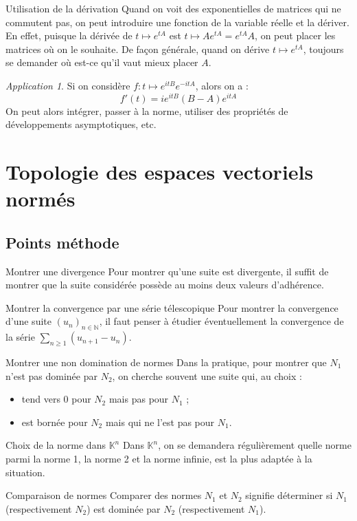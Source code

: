 \documentclass[french]{book}
\newcommand{\N}{\mathbb{N}}
\newcommand{\K}{\mathbb{K}}
\theoremstyle{plain}
\theoremstyle{definition}
\theoremstyle{remark}
\newtheorem*{app}{Application}
\begin{document}
\begin{AS}{Utilisation de la dérivation} Quand on voit des exponentielles de matrices qui ne commutent pas, on peut introduire une fonction de la variable réelle et la dériver. En effet, puisque la dérivée de $t\mapsto e^{tA}$ est $t\mapsto Ae^{tA}=e^{tA}A$, on peut placer les matrices où on le souhaite. De façon générale, quand on dérive $t\mapsto e^{tA}$, toujours se demander où est-ce qu'il vaut mieux placer $A$.
\end{AS}
\begin{app}
	Si on considère $f:t\mapsto e^{itB}e^{-itA}$, alors on a : $$f'(t)=ie^{itB}(B-A)e^{itA}$$ On peut alors intégrer, passer à la norme, utiliser des propriétés de développements asymptotiques, etc.
\end{app}


\chapter{Topologie des espaces vectoriels normés}
\localtableofcontents
\section{Points méthode}
\begin{PM}{Montrer une divergence} Pour montrer qu'une suite est divergente, il suffit de montrer que la suite considérée possède au moins deux valeurs d'adhérence.
\end{PM}
\begin{PM}{Montrer la convergence par une série télescopique} Pour montrer la convergence d'une suite $(u_n)_{n\in\N}$, il faut penser à étudier éventuellement la convergence de la série $\displaystyle\sum_{n\geqslant1}(u_{n+1}-u_n)$.
\end{PM}
\begin{PM}{Montrer une non domination de normes} Dans la pratique, pour montrer que $N_1$ n'est pas dominée par $N_2$, on cherche souvent une suite qui, au choix : 
\begin{itemize}
	\item tend vers $0$ pour $N_2$ mais pas pour $N_1$ ;
	\item est bornée pour $N_2$ mais qui ne l'est pas pour $N_1$.
\end{itemize}
\end{PM}
\begin{PM}{Choix de la norme dans $\K^n$} Dans $\K^n$, on se demandera régulièrement quelle norme parmi la norme 1, la norme 2 et la norme infinie, est la plus adaptée à la situation.
\end{PM}
\begin{PM}{Comparaison de normes} Comparer des normes $N_1$ et $N_2$ signifie déterminer si $N_1$ (respectivement $N_2$) est dominée par $N_2$ (respectivement $N_1$).
\end{PM}
\end{document}

